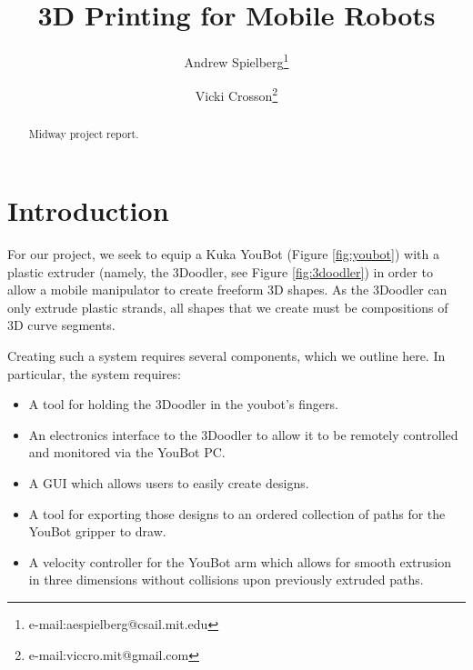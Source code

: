 \documentclass[conference]{acmsiggraph}
\title{3D Printing for Mobile Robots}
\author{Andrew Spielberg\thanks{e-mail:aespielberg@csail.mit.edu} \and Vicki Crosson\thanks{e-mail:viccro.mit@gmail.com}}
\begin{document}

\maketitle

\begin{abstract}

Midway project report.

\end{abstract}


\keywordlist


\TOGlinkslist


\copyrightspace

\section{Introduction}

For our project, we seek to equip a Kuka YouBot (Figure \ref{fig:youbot}) with a plastic extruder (namely, the 3Doodler, see Figure \ref{fig:3doodler}) in order to allow a mobile manipulator to create freeform 3D shapes.  As the 3Doodler can only extrude plastic strands, all shapes that we create must be compositions of 3D curve segments.

Creating such a system requires several components, which we outline here.  In particular, the system requires:

\begin{itemize}
\item A tool for holding the 3Doodler in the youbot's fingers.
\item An electronics interface to the 3Doodler to allow it to be remotely controlled and monitored via the YouBot PC.
\item A GUI which allows users to easily create designs.
\item A tool for exporting those designs to an ordered collection of paths for the YouBot gripper to draw.
\item A velocity controller for the YouBot arm which allows for smooth extrusion in three dimensions without collisions upon previously extruded paths.
\end{itemize}
\end{document}
